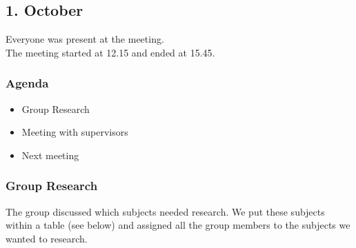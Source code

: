 \subsection*{1. October}

Everyone was present at the meeting.\\
The meeting started at 12.15 and ended at 15.45.

\subsubsection{Agenda}
\begin{itemize}
\item Group Research
\item Meeting with supervisors
\item Next meeting
\end{itemize}

\subsubsection{Group Research}

The group discussed which subjects needed research. We put these subjects within a table (see below) and assigned all the group members to the subjects we wanted to research.

